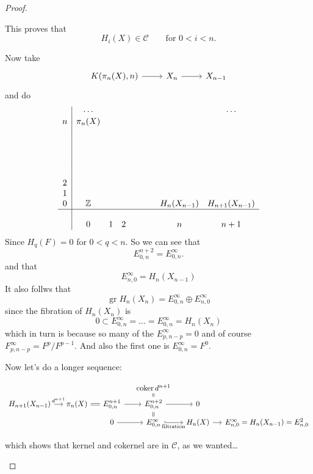 \documentclass{article}
\newcommand{\Z}{\mathbb{Z}}
\begin{document}
\begin{proof}
\begin{enumerate}
		This proves that
		 \[H_{i}(X)\in \mathcal{C}\qquad \text{for } 0<i<n.\]

 Now take
\[\begin{tikzcd}
	 	K(\pi_{n}(X),n)\arrow[r]&X_n\arrow[r]&X_{n-1}
\end{tikzcd}\]
and do
\begin{align*}
		\begin{array}{c|cccccccc}
			&\cdots&&&&&&&\cdots\\
			n&\pi_{n}(X)&&&&&&&\\
			&&&&&&&&\\
			&&&&&&&&\\
			&&&&&&&&\\
			&&&&&&&&\\
			&&&&&&&&\\
			2&&&&&&&&\\
			1&&&&&&&&\\
			0&\Z&&&&&&H_{n}(X_{n-1})&H_{n+1}(X_{n-1})\\
			\hline\\
			&0&1&2&&&&n&n+1
		\end{array}
	\end{align*}
Since $H_{q}(F)=0$ for $0<q<n$.
	So we can see that
	\[E^{n+2}_{0,n}=E^\infty_{0,n}.\]
	and that
	\[E^\infty_{n,0}=H_{n}(X_{n-1})\]
It also follws that
\[\operatorname{gr}H_{n}(X_n)=E^\infty_{0,n}\oplus E^\infty_{n,0}\]
since the fibration of $H_{n}(X_n)$ is
\[0\subset E^\infty_{0,n}=\ldots=E^\infty_{0,n}=H_{n}(X_n)\]
which in turn is because so many of the $E^\infty_{p,n-p}=0$ and of course $F^\infty_{p,n-p}=F^p/F^{p-1}$. And also the first one is $E^{\infty}_{0,n}=F^0$.

Now let's do a longer sequence:
\iffalse
\[\begin{tikzcd}
	H_{n+1}(X_{n-1})\arrow[r,"d^{n+1}]&\pi_{n}(X)=E^{n+1}\arrow[r]&E^{n+2}_{0,n}=\operatorname{coker}d^{n+1}=E^{\infty}_{0,n}\arrow[r,hook,"\text{filtration}"]&E^{\infty}_{n,0}=H_{n}(X_{n-1})=E^2_{n,0}
\end{tikzcd}\]\fi
\[\begin{tikzcd}[column sep=small,row sep=tiny]
	&&&\operatorname{coker}d^{n+1}\arrow[d,equals]\\
	H_{n+1}(X_{n-1}) \arrow[r,"d^{n+1}"] & \pi_{n}(X)\arrow[r,equals]&E^{n+1}_{0,n} \arrow[r] & E^{n+2}_{0,n}\arrow[r]\arrow[d,equals]&0\\
					     &&0\arrow[r]&E^{\infty}_{0,n} \arrow[r,hook,swap,"\text{filtration}"]&H_{n}(X)\arrow[r]& E^{\infty}_{n,0}=H_{n}(X_{n-1})=E^2_{n,0}
\end{tikzcd}\]

which shows that kernel and cokernel are in $\mathcal{C}$, as we wanted…
\end{enumerate}
\end{proof}
\end{document}

